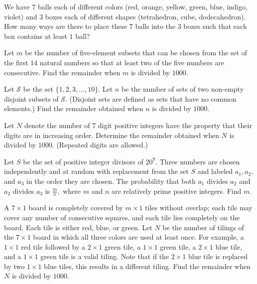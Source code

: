 \documentclass[mast]{lucky}
\begin{document}
\begin{prob}[]{3}
We have $7$ balls each of different colors (red, orange, yellow, green, blue, indigo, violet) and $3$ boxes each of different shapes (tetrahedron, cube, dodecahedron). How many ways are there to place these $7$ balls into the $3$ boxes such that each box contains at least $1$ ball?
\end{prob}
    
\begin{prob}[AIME II 2009/6]{3}
Let $m$ be the number of five-element subsets that can be chosen from the set of the first $14$ natural numbers so that at least two of the five numbers are consecutive. Find the remainder when $m$ is divided by $1000$. 
\end{prob}
    
\begin{prob}[AIME II 2002/9]{4}
Let $\mathcal{S}$ be the set $\lbrace1,2,3,\ldots,10\rbrace.$ Let $n$ be the number of sets of two non-empty disjoint subsets of $\mathcal{S}$. (Disjoint sets are defined as sets that have no common elements.) Find the remainder obtained when $n$ is divided by $1000$.
\end{prob}
    
     \begin{prob}{4}
Let $N$ denote the number of $7$ digit positive integers have the property that their digits are in increasing order. Determine the remainder obtained when $N$ is divided by $1000$. (Repeated digits are allowed.)
\end{prob}

     \begin{prob}[AIME I 2020/9]{4}
Let $S$ be the set of positive integer divisors of $20^9.$ Three numbers are chosen independently and at random with replacement from the set $S$ and labeled $a_1,a_2,$ and $a_3$ in the order they are chosen. The probability that both $a_1$ divides $a_2$ and $a_2$ divides $a_3$ is $\tfrac{m}{n},$ where $m$ and $n$ are relatively prime positive integers. Find $m.$
\end{prob}
    
     \begin{prob}[AIME II 2013/9]{6}
A $7\times 1$ board is completely covered by $m\times 1$ tiles without overlap; each tile may cover any number of consecutive squares, and each tile lies completely on the board. Each tile is either red, blue, or green. Let $N$ be the number of tilings of the $7\times 1$ board in which all three colors are used at least once. For example, a $1\times 1$ red tile followed by a $2\times 1$ green tile, a $1\times 1$ green tile, a $2\times 1$ blue tile, and a $1\times 1$ green tile is a valid tiling. Note that if the $2\times 1$ blue tile is replaced by two $1\times 1$ blue tiles, this results in a different tiling. Find the remainder when $N$ is divided by $1000$.
\end{prob}
    
\end{document}

